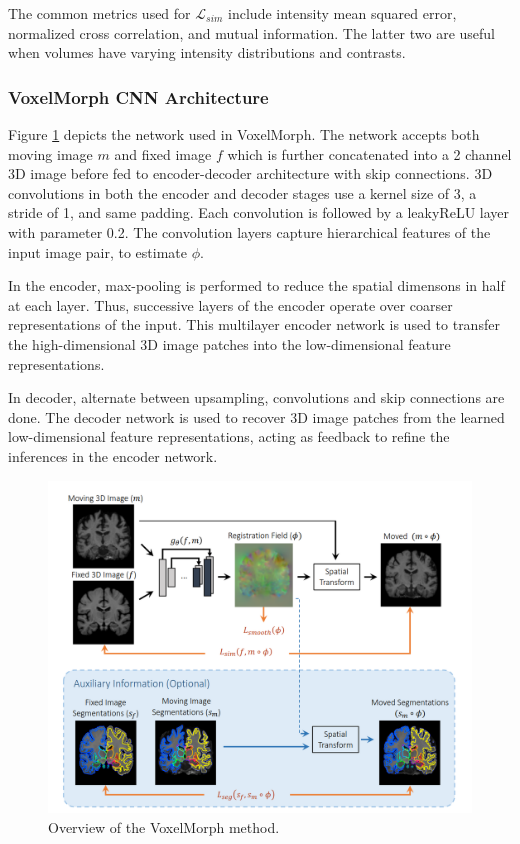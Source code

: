 \documentclass{report}
\begin{document}
	The common metrics used for $\mathcal{L}_{sim}$ include intensity mean squared error, normalized cross correlation, and mutual information. The latter two are useful when volumes have varying intensity distributions and contrasts.
	
	\subsubsection{VoxelMorph CNN Architecture}
	
	Figure \ref{fig:vxm} depicts the network used in VoxelMorph. The network accepts both moving image $m$ and fixed image $f$ which is further concatenated into a 2 channel 3D image before fed to encoder-decoder architecture with skip connections. 3D convolutions in both the encoder and decoder stages use a kernel size of 3, a stride of 1, and same padding. Each convolution is followed by a leakyReLU layer with parameter 0.2. The convolution layers capture hierarchical features of the input image pair, to estimate $\phi$.
	
	In the encoder, max-pooling is performed to reduce the spatial dimensons in half at each layer. Thus, successive layers of the encoder operate over coarser representations of the input. This multilayer encoder network is used to transfer the high-dimensional 3D image patches into the low-dimensional feature representations.
	
	In decoder, alternate between upsampling, convolutions and skip connections are done. The decoder network is used to recover 3D image patches from the learned low-dimensional feature representations, acting as feedback to refine the inferences in the encoder network.
	
	\begin{figure}[H]
		\centering
		\includegraphics[width=0.9\columnwidth]{resources/chapter2/vxm.png}
		\caption{Overview of the VoxelMorph method. \cite{Balakrishnan_2019}}
		\label{fig:vxm}
	\end{figure}
	
\end{document}
